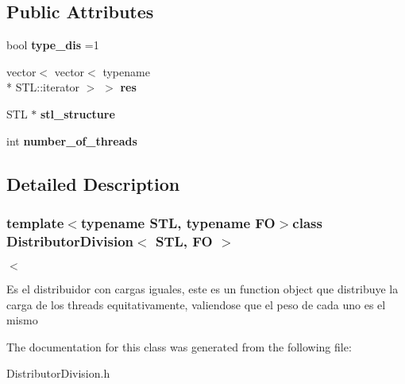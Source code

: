 \subsection*{Public Attributes}
\begin{DoxyCompactItemize}
\item 
\hypertarget{class_distributor_division_afa4ba8c8ee8752a7d9f4e1631d72c3ae}{bool {\bfseries type\-\_\-dis} =1}\label{class_distributor_division_afa4ba8c8ee8752a7d9f4e1631d72c3ae}

\item 
\hypertarget{class_distributor_division_aa3765b37f31212fd42652a182a683748}{vector$<$ vector$<$ typename \\*
S\-T\-L\-::iterator $>$ $>$ {\bfseries res}}\label{class_distributor_division_aa3765b37f31212fd42652a182a683748}

\item 
\hypertarget{class_distributor_division_a3eb8595ad7005f489af585b24b3bed4e}{S\-T\-L $\ast$ {\bfseries stl\-\_\-structure}}\label{class_distributor_division_a3eb8595ad7005f489af585b24b3bed4e}

\item 
\hypertarget{class_distributor_division_a2b9aebf1852cfcadf450ed0305bdb530}{int {\bfseries number\-\_\-of\-\_\-threads}}\label{class_distributor_division_a2b9aebf1852cfcadf450ed0305bdb530}

\end{DoxyCompactItemize}


\subsection{Detailed Description}
\subsubsection*{template$<$typename S\-T\-L, typename F\-O$>$class Distributor\-Division$<$ S\-T\-L, F\-O $>$}

$<$

Es el distribuidor con cargas iguales, este es un function object que distribuye la carga de los threads equitativamente, valiendose que el peso de cada uno es el mismo 

The documentation for this class was generated from the following file\-:\begin{DoxyCompactItemize}
\item 
Distributor\-Division.\-h\end{DoxyCompactItemize}

